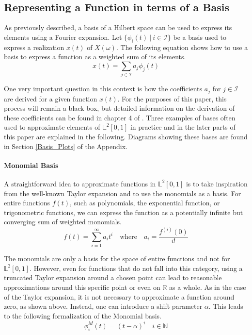 \documentclass[11pt,twoside,a4paper]{article}
\begin{document}
	\subsection{Representing a Function in terms of a Basis}\label{bases}
	As previously described, a basis of a Hilbert space can be used to express its elements using a Fourier expansion. Let $\{\phi_i(t) \: \vert \: i \in \mathcal{I}\}$ be a basis used to express a realization $x(t)$ of $X(\omega)$. The following equation shows how to use a basis to express a function as a weighted sum of its elements.
	\begin{equation}
		x(t) = \sum_{j \in \mathcal{I}} a_j \phi_j(t) 
	\end{equation}
	
	One very important question in this context is how the coefficients $a_j$ for $j \in \mathcal{I}$ are derived for a given function $x(t)$. For the purposes of this paper, this process will remain a black box, but detailed information on the derivation of these coefficients can be found in chapter 4 of \cite{ramsay_functional_2005}.
	Three examples of bases often used to approximate elements of $\mathbb{L}^2[0,1]$ in practice and in the later parts of this paper are explained in the following. Diagrams showing these bases are found in Section \ref{Basis_Plots} of the Appendix.
	\vspace{-0.2cm}
	
	\paragraph{Monomial Basis}\label{Monomial_basis}
	A straightforward idea to approximate functions in $\mathbb{L}^2[0,1]$ is to take inspiration from the well-known Taylor expansion and to use the monomials as a basis. For entire functions $f(t)$, such as polynomials, the exponential function, or trigonometric functions, we can express the function as a potentially infinite but converging sum of weighted monomials.
	\begin{equation}\label{Taylor_expansion}
		f(t) = \sum_{i = 1}^{\infty}a_i t^i \quad \text{where} \quad a_i = \frac{f^{(i)}(0)}{i!}
	\end{equation}
	
	The monomials are only a basis for the space of entire functions and not for $\mathbb{L}^2[0,1]$. However, even for functions that do not fall into this category, using a truncated Taylor expansion around a chosen point can lead to reasonable approximations around this specific point or even on $\mathbb{R}$ as a whole.
	As in the case of the Taylor expansion, it is not necessary to approximate a function around zero, as shown above. Instead, one can introduce a shift parameter $\alpha$. This leads to the following formalization of the Monomial basis.
	\begin{equation}
		\phi_{i}^{M}(t) = (t-\alpha)^i \quad i \in \mathbb{N}
	\end{equation}
\end{document}
